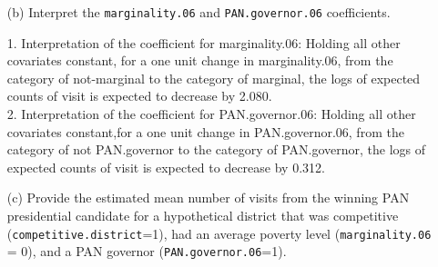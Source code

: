 \documentclass[12pt,letterpaper]{article}
\begin{document}
\begin{enumerate}
	\item [(b)]
	Interpret the \texttt{marginality.06} and \texttt{PAN.governor.06} coefficients.
	
	1. Interpretation of the coefficient for marginality.06: 
	Holding all other covariates constant, for a one unit change in marginality.06, from the category of not-marginal to the category of marginal, the logs of expected counts of visit is expected to decrease by 2.080. \\
	
	
	
	2. Interpretation of the coefficient for PAN.governor.06:  
	Holding all other covariates constant,for a one unit change in PAN.governor.06, from the category of not PAN.governor to the category of PAN.governor, the logs of expected counts of visit is expected to decrease by 0.312.\\ 
	
	\item [(c)]
	Provide the estimated mean number of visits from the winning PAN presidential candidate for a hypothetical district that was competitive (\texttt{competitive.district}=1), had an average poverty level (\texttt{marginality.06} = 0), and a PAN governor (\texttt{PAN.governor.06}=1).
	
	
	
	
\end{enumerate}
\end{document}
